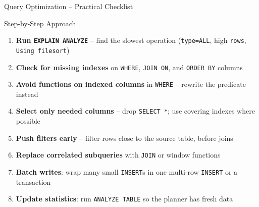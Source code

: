 \begin{frame}[fragile]{Query Optimization -- Practical Checklist}
  \begin{block}{Step-by-Step Approach}
    \begin{enumerate}
      \item \textbf{Run \texttt{EXPLAIN ANALYZE}} -- find the slowest operation
            (\texttt{type=ALL}, high \texttt{rows}, \texttt{Using filesort})
      \item \textbf{Check for missing indexes} on \texttt{WHERE},
            \texttt{JOIN ON}, and \texttt{ORDER BY} columns
      \item \textbf{Avoid functions on indexed columns} in \texttt{WHERE} --
            rewrite the predicate instead
      \item \textbf{Select only needed columns} -- drop \texttt{SELECT *};
            use covering indexes where possible
      \item \textbf{Push filters early} -- filter rows close to the source
            table, before joins
      \item \textbf{Replace correlated subqueries} with \texttt{JOIN} or
            window functions
      \item \textbf{Batch writes}: wrap many small \texttt{INSERT}s in one
            multi-row \texttt{INSERT} or a transaction
      \item \textbf{Update statistics}: run \texttt{ANALYZE TABLE} so the
            planner has fresh data
    \end{enumerate}
  \end{block}
\end{frame}
